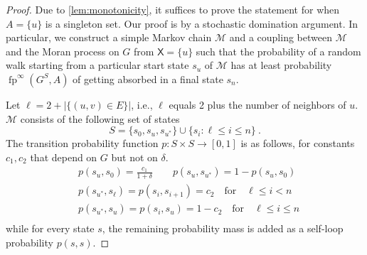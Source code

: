 \documentclass[letterpaper]{article}
\newcommand{\X}{\mathsf{X}}
\newcommand{\fp}{\operatorname{fp}}
\newcommand{\FitAdv}{\delta}
\newcommand{\MC}{\mathcal{M}}
\begin{document}
\lemfixprobstrong*
\begin{proof}
Due to \cref{lem:monotonicity}, it suffices to prove the statement for when $A=\{u\}$ is a singleton set.
Our proof is by a stochastic domination argument.
In particular, we construct a simple Markov chain $\MC$ and a coupling between $\MC$ and the Moran process on $G$ from $\X=\{u\}$ such that the probability of a random walk starting from a particular start state $s_u$ of $\MC$ has at least probability $\fp^{\infty}(G^S, A)$ of getting absorbed in a final state $s_n$.

Let $\ell=2+|\{(u,v)\in E\}|$, i.e., $\ell$ equals 2 plus the number of neighbors of $u$.
$\MC$ consists of the following set of states
 \[
S=\{s_0, s_{u},  s_{u^*}\} \cup \{s_i\colon \ell\leq i \leq n\}\ .
\]
The transition probability function $p\colon S\times S \to[0,1]$ is as follows, for constants $ c_1, c_2$ that depend on $G$ but not on $\FitAdv$.
\begin{align*}
&p(s_u, s_0)=\frac{c_1}{1+\FitAdv}  \qquad  p(s_u, s_{u^*}) = 1-p(s_u, s_0)\\
&p(s_{u^*}, s_{\ell}) = p(s_{i}, s_{i+1}) = c_2 \quad \text{for} \quad \ell \leq i < n\\
&p(s_{u^*}, s_u) = p(s_{i}, s_u)=1-c_2\quad \text{for} \quad \ell \leq i \leq n\\
\end{align*}
while for every state $s$, the remaining probability mass is added as a self-loop probability $p(s,s)$.


\end{proof}
\end{document}
